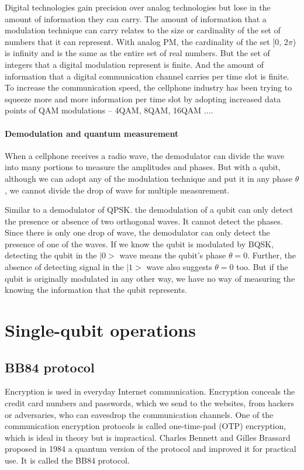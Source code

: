 \documentclass{book}
\begin{document}
Digital technologies gain precision over analog technologies but lose in the amount of information they can carry. The amount of information that a modulation technique can carry relates to the size or cardinality of the set of numbers that it can represent. With analog PM, the cardinality of the set [0, 2$\pi$) is infinity and is the same as the entire set of real numbers. But the set of integers that a digital modulation represent is finite. And the amount of information that a digital communication channel carries per time slot is finite. To increase the communication speed, the cellphone industry has been trying to squeeze more and more information per time slot by adopting increased data points of QAM modulations -- 4QAM, 8QAM, 16QAM ....

\subsubsection{Demodulation and quantum measurement}
When a cellphone receives a radio wave, the demodulator can divide the wave into many portions to measure the amplitudes and phases. But with a qubit, although we can adopt any of the modulation technique and put it in any phase $\theta$, we cannot divide the drop of wave for multiple measurement.

Similar to a demodulator of QPSK. the demodulation of a qubit can only detect the presence or absence of two orthogonal waves. It cannot detect the phases. Since there is only one drop of wave, the demodulator can only detect the presence of one of the waves. If we know the qubit is modulated by BQSK, detecting the qubit in the $|0>$ wave means the qubit's phase $\theta = 0$. Further, the absence of detecting signal in the $|1>$ wave also suggests $\theta = 0$ too. But if the qubit is originally modulated in any other way, we have no way of measuring the knowing the information that the qubit represents.

\chapter{Single-qubit operations}

\section{BB84 protocol}
Encryption is used in everyday Internet communication. Encryption conceals the credit card numbers and passwords, which we send to the websites, from hackers or adversaries, who can eavesdrop the communication channels. One of the communication encryption protocols is called one-time-pad (OTP) encryption, which is ideal in theory but is impractical. Charles Bennett and Gilles Brassard proposed in 1984 a quantum version of the protocol and improved it for practical use. It is called the BB84 protocol.
\end{document}
